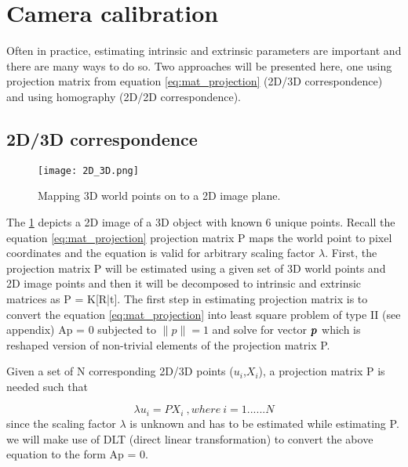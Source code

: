 \section{Camera calibration}
Often in practice, estimating intrinsic and extrinsic parameters are important and there are many ways to do so. Two approaches will be presented here, one using projection matrix from equation \ref{eq:mat_projection} (2D/3D correspondence) and using homography (2D/2D correspondence).

\subsection{2D/3D correspondence}

\begin{figure}[hbt!]
	\centering
	\texttt{[image: 2D\_3D.png]}
	\caption{Mapping 3D world points on to a 2D image plane.}
	\label{fig:2D_3D}
\end{figure}

The \cref{fig:2D_3D} depicts a 2D image of a 3D object with known 6 unique points. Recall  the equation \ref{eq:mat_projection} projection matrix P maps the world point to pixel coordinates and the equation is valid for arbitrary scaling factor $\lambda$. First, the projection matrix P will be estimated using a given set of 3D world points and 2D image points and then it will be decomposed to intrinsic and extrinsic matrices as P = K[R|t]. The first step in estimating projection matrix is to convert the equation \ref{eq:mat_projection} into least square problem of type II (see appendix) Ap = 0 subjected to $ \|p\| = 1 $ and solve for vector $\bm{p}$ which is reshaped version of non-trivial elements of the projection matrix P. 

Given a set of N corresponding 2D/3D points (\textbf{$u_i$},\textbf{$X_i$}), a projection matrix P is needed such that

\begin{equation*}
	\lambda\textbf{$u_i$} = P \textbf{$X_i$}\ ,  where\ i = 1......N
\end{equation*}
since the scaling factor $\lambda$ is unknown and has to be estimated while estimating P. we will make use of DLT (direct linear transformation) to convert the above equation to the form Ap = 0.

